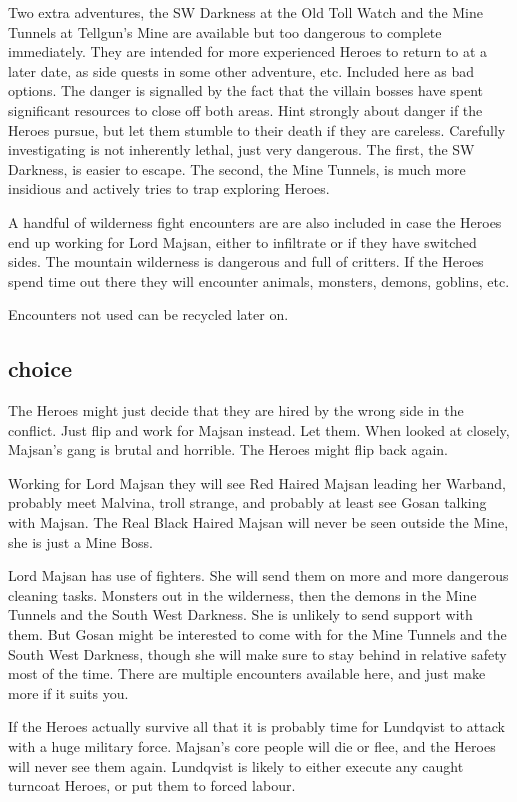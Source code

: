 Two extra adventures, the SW Darkness at the Old Toll Watch and the Mine Tunnels at Tellgun's Mine are available but too dangerous to complete immediately. They are intended for more experienced Heroes to return to at a later date, as side quests in some other adventure, etc.
Included here as bad options. The danger is signalled by the fact that the villain bosses have spent significant resources to close off both areas. Hint strongly about danger if the Heroes pursue, but let them stumble to their death if they are careless. Carefully investigating is not inherently lethal, just very dangerous. The first, the SW Darkness, is easier to escape. The second, the Mine Tunnels, is much more insidious and actively tries to trap exploring Heroes.

A handful of wilderness fight encounters are are also included in case the Heroes end up working for Lord Majsan, either to infiltrate or if they have switched sides. The mountain wilderness is dangerous and full of critters. If the Heroes spend time out there they will encounter animals, monsters, demons, goblins, etc.

Encounters not used can be recycled later on.


\subsection*{choice}
The Heroes might just decide that they are hired by the wrong side in the conflict. Just flip and work for Majsan instead. Let them. When looked at closely, Majsan's gang is brutal and horrible. The Heroes might flip back again.

Working for Lord Majsan they will see Red Haired Majsan leading her Warband, probably meet Malvina, troll strange, and probably at least see Gosan talking with Majsan. The Real Black Haired Majsan will never be seen outside the Mine, she is just a Mine Boss.

Lord Majsan has use of fighters. She will send them on more and more dangerous cleaning tasks. Monsters out in the wilderness, then the demons in the Mine Tunnels and the South West Darkness. She is unlikely to send support with them. But Gosan might be interested to come with for the Mine Tunnels and the South West Darkness, though she will make sure to stay behind in relative safety most of the time.
There are multiple encounters available here, and just make more if it suits you.

If the Heroes actually survive all that it is probably time for Lundqvist to attack with a huge military force. Majsan's core people will die or flee, and the Heroes will never see them again. Lundqvist is likely to either execute any caught turncoat Heroes, or put them to forced labour.






